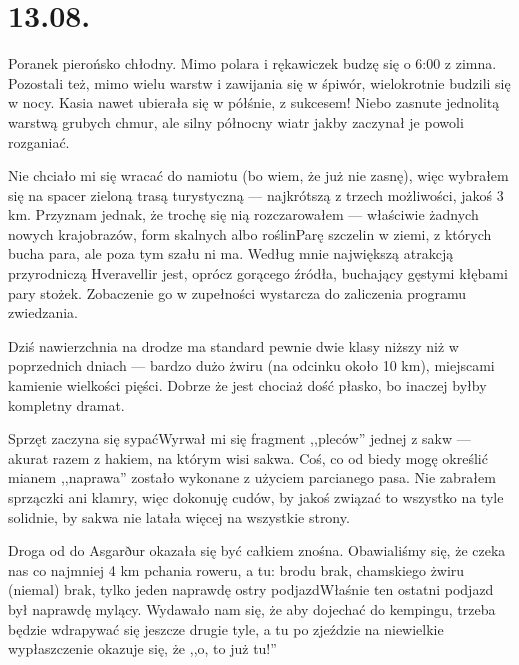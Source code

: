 \chapter*{13.08.}

Poranek pierońsko chłodny. Mimo polara i rękawiczek budzę się o 6:00 z zimna. Pozostali też, mimo wielu warstw i zawijania się w śpiwór, wielokrotnie budzili się w nocy. Kasia nawet ubierała się w półśnie, z sukcesem! Niebo zasnute jednolitą warstwą grubych chmur, ale silny północny wiatr jakby zaczynał je powoli rozganiać.

Nie chciało mi się wracać do namiotu (bo wiem, że już nie zasnę), więc wybrałem się na spacer zieloną trasą turystyczną --- najkrótszą z trzech możliwości, jakoś 3 km. Przyznam jednak, że trochę się nią rozczarowałem --- właściwie żadnych nowych krajobrazów, form skalnych albo roślin\textellipsis Parę szczelin w ziemi, z których bucha para, ale poza tym szału ni ma. Według mnie największą atrakcją przyrodniczą Hveravellir jest, oprócz gorącego źródła, buchający gęstymi kłębami pary stożek. Zobaczenie go w zupełności wystarcza do zaliczenia programu zwiedzania.


Dziś nawierzchnia na drodze ma standard pewnie dwie klasy niższy niż w poprzednich dniach --- bardzo dużo żwiru (na odcinku około 10 km), miejscami kamienie wielkości pięści. Dobrze że jest chociaż dość płasko, bo inaczej byłby kompletny dramat.


Sprzęt zaczyna się sypać\textellipsis Wyrwał mi się fragment ,,pleców'' jednej z sakw --- akurat razem z hakiem, na którym wisi sakwa. Coś, co od biedy mogę określić mianem ,,naprawa'' zostało wykonane z użyciem parcianego pasa. Nie zabrałem sprzączki ani klamry, więc dokonuję cudów, by jakoś związać to wszystko na tyle solidnie, by sakwa nie latała więcej na wszystkie strony.

Droga od  do Asgarður okazała się być całkiem znośna. Obawialiśmy się, że czeka nas co najmniej 4 km pchania roweru, a tu: brodu brak, chamskiego żwiru (niemal) brak, tylko jeden naprawdę ostry podjazd\textellipsis Właśnie ten ostatni podjazd był naprawdę mylący. Wydawało nam się, że aby dojechać do kempingu, trzeba będzie wdrapywać się jeszcze drugie tyle, a tu po zjeździe na niewielkie wypłaszczenie okazuje się, że ,,o, to już tu!''

